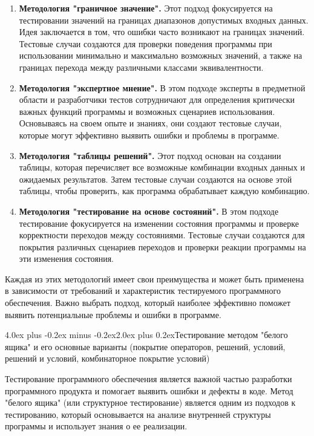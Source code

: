 \documentclass[12pt, a4paper]{book}%
\makeatletter
\renewcommand{\section}{\@startsection{section}{1}{1pt}%
{4.0ex plus -0.2ex minus -0.2ex}{2.0ex plus 0.2ex}{\centering\bf}}%
\makeatother
\begin{document}
{\begin{enumerate}
\item {\bf Методология "граничное значение".}
Этот подход фокусируется на тестировании значений на границах диапазонов допустимых входных данных. Идея заключается в том, что ошибки часто возникают на границах значений. Тестовые случаи создаются для проверки поведения программы при использовании минимально и максимально возможных значений, а также на границах перехода между различными классами эквивалентности.

\item {\bf Методология "экспертное мнение".}
В этом подходе эксперты в предметной области и разработчики тестов сотрудничают для определения критически важных функций программы и возможных сценариев использования. Основываясь на своем опыте и знаниях, они создают тестовые случаи, которые могут эффективно выявить ошибки и проблемы в программе.

\item {\bf Методология "таблицы решений".}
Этот подход основан на создании таблицы, которая перечисляет все возможные комбинации входных данных и ожидаемых результатов. Затем тестовые случаи создаются на основе этой таблицы, чтобы проверить, как программа обрабатывает каждую комбинацию.

\item {\bf Методология "тестирование на основе состояний".}
В этом подходе тестирование фокусируется на изменении состояния программы и проверке корректности переходов между состояниями. Тестовые случаи создаются для покрытия различных сценариев переходов и проверки реакции программы на эти изменения состояния.

\end{enumerate}

Каждая из этих методологий имеет свои преимущества и может быть применена в зависимости от требований и характеристик тестируемого программного обеспечения. Важно выбрать подход, который наиболее эффективно поможет выявить потенциальные проблемы и ошибки в программе.

\section{Тестирование методом "белого ящика" и его основные варианты (покрытие операторов, решений, условий, решений и условий, комбинаторное покрытие условий)}

Тестирование программного обеспечения является важной частью разработки программного продукта и помогает выявить ошибки и дефекты в коде. Метод "белого ящика" (или структурное тестирование) является одним из подходов к тестированию, который основывается на анализе внутренней структуры программы и использует знания о ее реализации.

}
\end{document}
